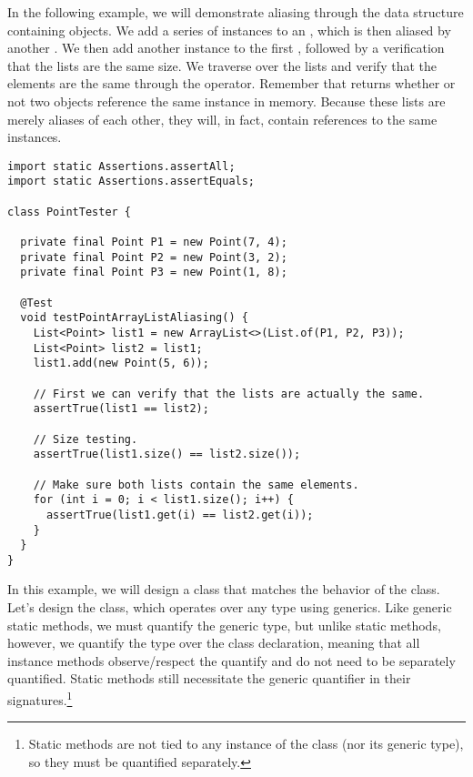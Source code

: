 In the following example, we will demonstrate aliasing through the  data structure containing  objects.
We add a series of  instances to an , which is then aliased by another . 
We then add another  instance to the first , followed by a verification that the lists are the same size. 
We traverse over the lists and verify that the elements are the same through the \ttt{==} operator. 
Remember that \ttt{==} returns whether or not two objects reference the same instance in memory. 
Because these lists are merely aliases of each other, they will, in fact, contain references to the same  instances.

\begin{lstlisting}[language=MyJava]
import static Assertions.assertAll;
import static Assertions.assertEquals;

class PointTester {

  private final Point P1 = new Point(7, 4);
  private final Point P2 = new Point(3, 2);
  private final Point P3 = new Point(1, 8);

  @Test
  void testPointArrayListAliasing() {
    List<Point> list1 = new ArrayList<>(List.of(P1, P2, P3));
    List<Point> list2 = list1;
    list1.add(new Point(5, 6));

    // First we can verify that the lists are actually the same.
    assertTrue(list1 == list2);

    // Size testing.
    assertTrue(list1.size() == list2.size());

    // Make sure both lists contain the same elements.
    for (int i = 0; i < list1.size(); i++) {
      assertTrue(list1.get(i) == list2.get(i));
    }
  }
}
\end{lstlisting}

\newpage %
In this example, we will design a class that matches the behavior of the  class. 
Let's design the  class, which operates over any type using generics. 
Like generic static methods, we must quantify the generic type, but unlike static methods, however, we quantify the type over the class declaration, meaning that all instance methods observe/respect the quantify and do not need to be separately quantified. 
Static methods still necessitate the generic quantifier in their signatures.\footnote{Static methods are not tied to any instance of the class (nor its generic type), so they must be quantified separately.}

